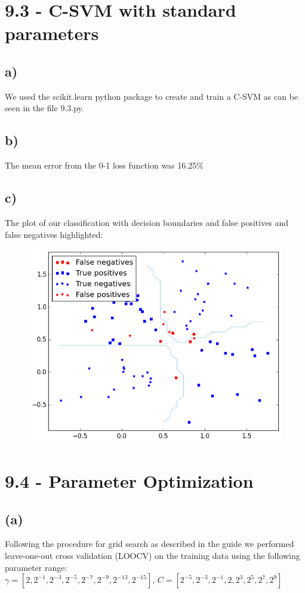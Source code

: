 \documentclass[11pt,a4paper]{article}
\begin{document}
\section*{9.3 - C-SVM with standard parameters}
\subsection*{a)}
We used the scikit.learn python package to create and train a C-SVM as can be seen in the file 9.3.py.
\subsection*{b)}
The mean error from the 0-1 loss function was 16.25\%
\subsection*{c)}
The plot of our classification with decision boundaries and false positives and false negatives highlighted:
\begin{figure}[h]
  \centering
  \includegraphics[width=\linewidth]{9_3.png}
\end{figure}

\section*{9.4 - Parameter Optimization}
\subsection*{(a)}
Following the procedure for grid search as described in the guide we performed leave-one-out cross validation (LOOCV) on the training data using the following parameter range:\\
$ \gamma = [2,2^{-1},2^{-3},2^{-5},2^{-7},2^{-9},2^{-13},2^{-15}] $, $ C = [2^{-5},2^{-3},2^{-1},2,2^{3},2^{5},2^{7},2^9]$
\end{document}
